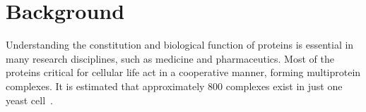 \documentclass[twocolumn]{bmcart}%
\begin{document}
\begin{frontmatter}
\begin{fmbox}
\begin{abstractbox}

\begin{keyword}
\end{keyword}


\end{abstractbox}
%
\end{fmbox}%

\end{frontmatter}



\section*{Background}
Understanding the constitution and biological function of proteins is essential in many research disciplines, such as medicine and pharmaceutics.
Most of the proteins critical for cellular life act in a cooperative manner, forming multiprotein complexes. 
It is estimated that approximately 800 complexes exist in just one yeast cell~\cite{Gavin}. 
\end{document}
